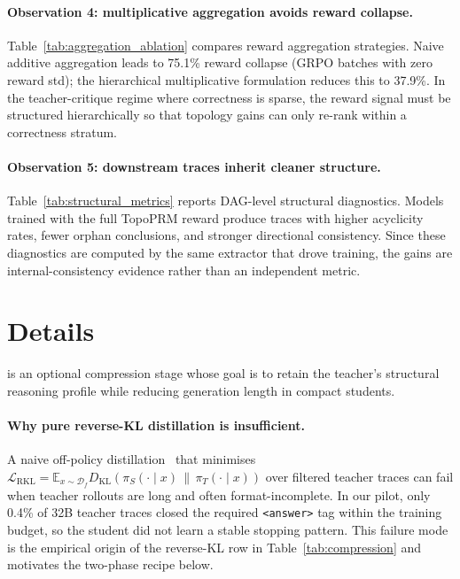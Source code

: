 

\paragraph{Observation 4: multiplicative aggregation avoids reward collapse.}
Table~\ref{tab:aggregation_ablation} compares reward aggregation strategies.
Naive additive aggregation leads to 75.1\% reward collapse (GRPO batches with zero reward std); the hierarchical multiplicative formulation reduces this to 37.9\%.
In the teacher-critique regime where correctness is sparse, the reward signal must be structured hierarchically so that topology gains can only re-rank within a correctness stratum.



\paragraph{Observation 5: downstream traces inherit cleaner structure.}
Table~\ref{tab:structural_metrics} reports DAG-level structural diagnostics.
Models trained with the full TopoPRM reward produce traces with higher acyclicity rates, fewer orphan conclusions, and stronger directional consistency.
Since these diagnostics are computed by the same extractor that drove training, the gains are internal-consistency evidence rather than an independent metric.

\section{\framework Details}
\label{appx:tgsd_details}

\framework is an optional compression stage whose goal is to retain the teacher's structural reasoning profile while reducing generation length in compact students.

\paragraph{Why pure reverse-KL distillation is insufficient.}
A naive off-policy distillation~\citep{hinton2015distilling,minillm2023} that minimises
$\mathcal{L}_{\mathrm{RKL}} = \mathbb{E}_{x\sim\mathcal{D}_f}
D_{\mathrm{KL}}(\pi_S(\cdot\!\mid\!x)\,\|\,\pi_T(\cdot\!\mid\!x))$
over filtered teacher traces can fail when teacher rollouts are long and often format-incomplete.
In our pilot, only 0.4\% of 32B teacher traces closed the required \texttt{<answer>} tag within the training budget, so the student did not learn a stable stopping pattern.
This failure mode is the empirical origin of the reverse-KL row in Table~\ref{tab:compression} and motivates the two-phase \framework recipe below.

